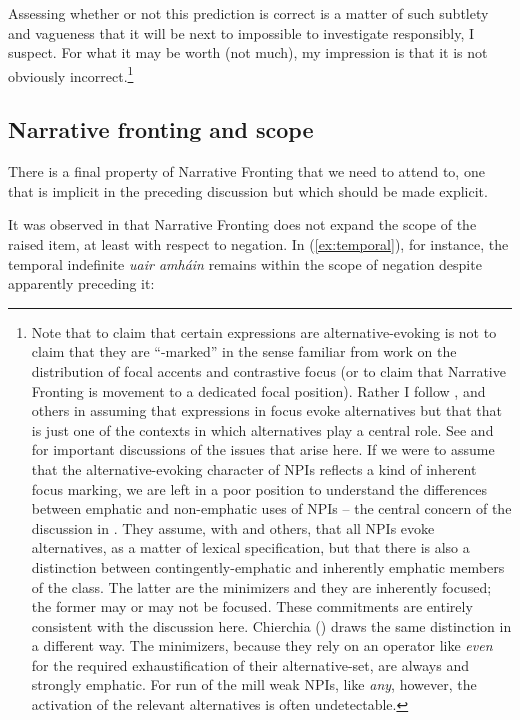 \documentclass[output=paper,colorlinks,citecolor=brown]{langscibook}
\begin{document}
Assessing whether or not this prediction is correct is a matter of such subtlety and vagueness that it will be next to impossible to investigate responsibly, I suspect. For what it may be worth (not much), my impression is that it is not obviously incorrect.\footnote{Note that to claim \label{fn:pain} that certain expressions are alternative-evoking is not to claim that they are “\F-marked” in the sense familiar from work on the distribution of focal accents and contrastive focus (or to claim that Narrative Fronting is movement to a dedicated focal position). Rather I follow \citet{krifka:95}, \citet{jeong-roelofsen:23} and others in assuming that expressions in focus evoke alternatives but that that is just one of the contexts in which alternatives play a central role.  See \citet{krifka:95} and \citet{jeong-roelofsen:23} for important discussions of the issues that arise here. If we were to assume that the alternative-evoking character of NPIs reflects a kind of inherent focus marking, we are left in a poor position to understand the differences between emphatic and non-emphatic uses of NPIs -- the central concern of the discussion in \citet{jeong-roelofsen:23}. They assume, with  \citet{krifka:95} and others, that all NPIs evoke alternatives, as a matter of lexical   specification, but that there is also a distinction between contingently\hyp emphatic and inherently emphatic members of the class. The latter are the minimizers and they are inherently focused; the former may or may not be focused. These commitments are entirely consistent with the discussion here. Chierchia (\citeyear{chierchia:13}) draws the same distinction in a different way. The minimizers, because they rely on an operator like {\itshape even} for the required exhaustification of their alternative-set, are always and strongly emphatic. For run of the mill weak NPIs, like {\itshape any}, however, the activation of the relevant alternatives is often undetectable.}

\subsection{Narrative fronting and scope}
\label{sec:nfscope}
There is a final property of Narrative Fronting that we need to attend to, one that is implicit in the preceding discussion but which should be made explicit.

It was observed in \citet[76--86]{mccloskey:96a} that Narrative Fronting does not expand the scope of the raised item, at least with respect to negation. In (\ref{ex:temporal}), for instance, the temporal indefinite {\itshape uair amháin} remains within the scope of negation despite apparently preceding it:
\end{document}
